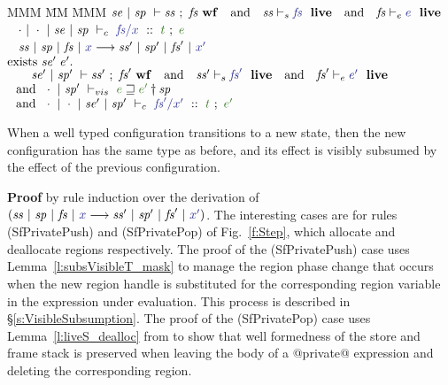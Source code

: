 
\label{s:Preservation}

\smallskip
\begin{theorem}[Preservation]
\end{theorem}


\begin{tabbing}
MMM     \= MM  \= MMM   \kill
\pIf    \> $\WfFS{\mse}{\msp}{\mss}{\mfs}
                ~~~\pand~~~ \LiveS{\mss}{\mfs} 
                ~~~\pand~~~ \LiveE{\mfs}{e}$                                    \\
~\pand  \> $\TypeC{\nil}{\nil}{\mse}{\msp}{\mfs}{x}{t}{e}$                      \\
~\pand  \> $\StepF{\mss}{\msp}{\mfs}{x}{\mss'}{\msp'}{\mfs'}{x'}$               \\
\pthen  \> $\textrm{exists}~ \mathit{se}'~ e'.$                                               \\
        \> ~~~ $\WfFS{\mse'}{\msp'}{\mss'}{\mfs'}
                ~~~\pand~~~ \LiveS{\mss'}{\mfs'}
                ~~~\pand~~~ \LiveE{\mfs'}{e'}$                                  \\
        \> $~~ \pand~~  \SubsVisibleT{\nil}{\msp'}{\msp}{e}{e'}$                \\
        \> $~~ \pand~~  \TypeC{\nil}{\nil}{\mse'}{\msp'}{\mfs'}{x'}{t}{e'}$
\end{tabbing}

\noindent
When a well typed configuration transitions to a new state, then the new configuration has the same type as before, and its effect is visibly subsumed by the effect of the previous configuration.

\medskip\noindent
\textbf{Proof} by rule induction over the derivation of $(\StepF{\mss}{\msp}{\mfs}{x}{\mss'}{\msp'}{\mfs'}{x'})$. The interesting cases are for rules (SfPrivatePush)  and (SfPrivatePop) of Fig.~\ref{f:Step}, which allocate and deallocate regions respectively. The proof of the (SfPrivatePush) case uses Lemma~\ref{l:subsVisibleT_mask} to manage the region phase change that occurs when the new region handle is substituted for the corresponding region variable in the expression under evaluation. This process is described in \S\ref{s:VisibleSubsumption}. The proof of the (SfPrivatePop) case uses Lemma~\ref{l:liveS_dealloc} from to show that well formedness of the store and frame stack is preserved when leaving the body of a @private@ expression and deleting the corresponding region.
\qqed

